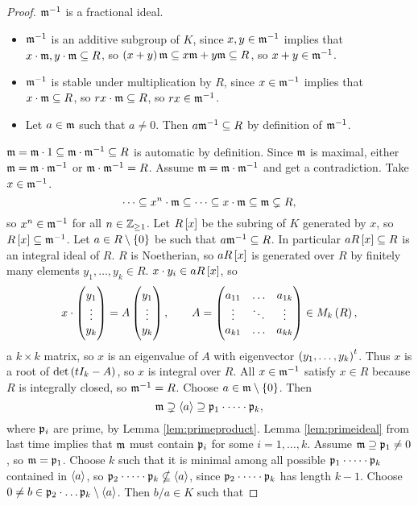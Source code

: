 \begin{proof}
$ \mathfrak{m}^{-1} $ is a fractional ideal.
\begin{itemize}
\item $ \mathfrak{m}^{-1} $ is an additive subgroup of $ K $, since $ x, y \in \mathfrak{m}^{-1} $ implies that $ x \cdot \mathfrak{m}, y \cdot \mathfrak{m} \subseteq R $, so $ \br{x + y}\mm \subseteq x\mm + y\mm \subseteq R $, so $ x + y \in \mathfrak{m}^{-1} $.
\item $ \mathfrak{m}^{-1} $ is stable under multiplication by $ R $, since $ x \in \mathfrak{m}^{-1} $ implies that $ x \cdot \mathfrak{m} \subseteq R $, so $ rx \cdot \mathfrak{m} \subseteq R $, so $ rx \in \mathfrak{m}^{-1} $.
\item Let $ a \in \mathfrak{m} $ such that $ a \ne 0 $. Then $ a\mathfrak{m}^{-1} \subseteq R $ by definition of $ \mathfrak{m}^{-1} $.
\end{itemize}
$ \mathfrak{m} = \mathfrak{m} \cdot 1 \subseteq \mathfrak{m} \cdot \mathfrak{m}^{-1} \subseteq R $ is automatic by definition. Since $ \mathfrak{m} $ is maximal, either $ \mathfrak{m} = \mathfrak{m} \cdot \mathfrak{m}^{-1} $ or $ \mathfrak{m} \cdot \mathfrak{m}^{-1} = R $. Assume $ \mathfrak{m} = \mathfrak{m} \cdot \mathfrak{m}^{-1} $ and get a contradiction. Take $ x \in \mathfrak{m}^{-1} $.
$$ \dots \subseteq x^n \cdot \mathfrak{m} \subseteq \dots \subseteq x \cdot \mathfrak{m} \subseteq \mathfrak{m} \subsetneq R, $$
so $ x^n \in \mathfrak{m}^{-1} $ for all $ n \in \mathbb{Z}_{\ge 1} $. Let $ R\sbr{x} $ be the subring of $ K $ generated by $ x $, so $ R\sbr{x} \subseteq \mm^{-1} $. Let $ a \in R \setminus \cbr{0} $ be such that $ a\mathfrak{m}^{-1} \subseteq R $. In particular $ aR\sbr{x} \subseteq R $ is an integral ideal of $ R $. $ R $ is Noetherian, so $ aR\sbr{x} $ is generated over $ R $ by finitely many elements $ y_1, \dots, y_k \in R $. $ x \cdot y_i \in aR\sbr{x} $, so
$$ x \cdot \threebyone{y_1}{\vdots}{y_k} = A\threebyone{y_1}{\vdots}{y_k}, \qquad A = \threebythree{a_{11}}{\dots}{a_{1k}}{\vdots}{\ddots}{\vdots}{a_{k1}}{\dots}{a_{kk}} \in M_k\br{R}, $$
a $ k \times k $ matrix, so $ x $ is an eigenvalue of $ A $ with eigenvector $ \br{y_1, \dots, y_k}^t $. Thus $ x $ is a root of $ \det\br{tI_k - A} $, so $ x $ is integral over $ R $. All $ x \in \mathfrak{m}^{-1} $ satisfy $ x \in R $ because $ R $ is integrally closed, so $ \mathfrak{m}^{-1} = R $. Choose $ a \in \mm \setminus \cbr{0} $. Then
$$ \mathfrak{m} \supsetneq \left\langle a \right\rangle \supseteq \mathfrak{p}_1 \cdot \dots \cdot \mathfrak{p}_k, $$
where $ \mathfrak{p}_i $ are prime, by Lemma \ref{lem:primeproduct}. Lemma \ref{lem:primeideal} from last time implies that $ \mathfrak{m} $ must contain $ \mathfrak{p}_i $ for some $ i = 1, \dots, k $. Assume $ \mathfrak{m} \supseteq \mathfrak{p}_1 \ne 0 $, so $ \mathfrak{m} = \mathfrak{p}_1 $. Choose $ k $ such that it is minimal among all possible $ \mathfrak{p}_1 \cdot \dots \cdot \mathfrak{p}_k $ contained in $ \left\langle a \right\rangle $, so $ \mathfrak{p}_2 \cdot \dots \cdot \mathfrak{p}_k \nsubseteq \left\langle a \right\rangle $, since $ \mathfrak{p}_2 \cdot \dots \cdot \mathfrak{p}_k $ has length $ k - 1 $. Choose $ 0 \ne b \in \mathfrak{p}_2 \cdot \dots \mathfrak{p}_k \setminus \left\langle a \right\rangle $. Then $ b / a \in K $ such that

\end{proof}
